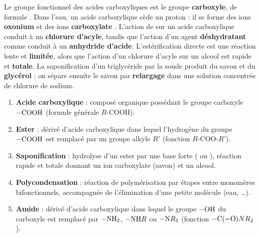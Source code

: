 \documentclass[11pt]{article}
\begin{document}
\begin{corrige}
Le groupe fonctionnel des acides carboxyliques est le groupe \textbf{carboxyle}, de formule . Dans l'eau, un acide carboxylique cède un proton : il se forme des ions \textbf{oxonium}  et des ions \textbf{carboxylate} . L'action de  sur un acide carboxylique conduit à un \textbf{chlorure d'acyle}, tandis que l'action d'un agent \textbf{déshydratant} comme  conduit à un \textbf{anhydride d'acide}. L'estérification directe est une réaction lente et \textbf{limitée}, alors que l'action d'un chlorure d'acyle sur un alcool est rapide et \textbf{totale}. La saponification d'un triglycéride par la soude produit du savon et du \textbf{glycérol} ; on sépare ensuite le savon par \textbf{relargage} dans une solution concentrée de chlorure de sodium.
\end{corrige}

\begin{corrige}
\begin{enumerate}
\item \textbf{Acide carboxylique} : composé organique possédant le groupe carboxyle $-\ce{COOH}$ (formule générale $R\text{-COOH}$).
\item \textbf{Ester} : dérivé d'acide carboxylique dans lequel l'hydrogène du groupe $-\ce{COOH}$ est remplacé par un groupe alkyle $R'$ (fonction $R\text{-COO-}R'$).
\item \textbf{Saponification} : hydrolyse d'un ester par une base forte ( ou ), réaction rapide et totale donnant un ion carboxylate (savon) et un alcool.
\item \textbf{Polycondensation} : réaction de polymérisation par étapes entre monomères bifonctionnels, accompagnée de l'élimination d'une petite molécule (eau, \ldots).
\item \textbf{Amide} : dérivé d'acide carboxylique dans lequel le groupe $-\ce{OH}$ du carboxyle est remplacé par $-\ce{NH2}$, $-\ce{NH}R$ ou $-\ce{N}R_2$ (fonction $-\ce{C(=O)}NR_2$).
\end{enumerate}
\end{corrige}
\end{document}
